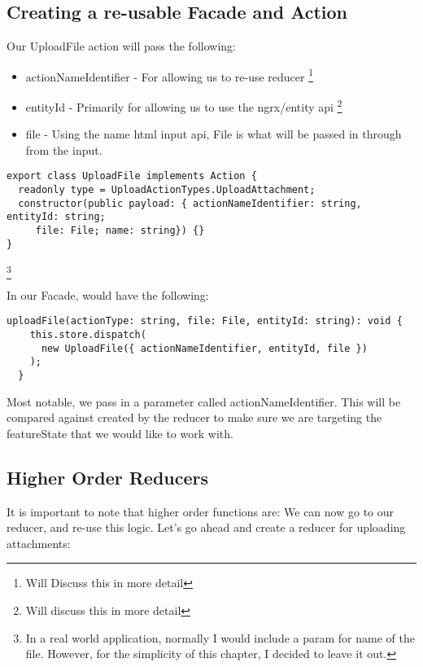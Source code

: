 \subsection{Creating a re-usable Facade and Action}
Our UploadFile action will pass the following:
\begin{itemize}
  \item actionNameIdentifier - For allowing us to re-use reducer
  \footnote{Will Discuss this in more detail}
  \item entityId - Primarily for allowing us to use the ngrx/entity api
  \footnote{Will discuss this in more detail}
  \item file - Using the name html input api, File is what will be passed in
  through from the input.
\end{itemize}
\begin{lstlisting}
export class UploadFile implements Action {
  readonly type = UploadActionTypes.UploadAttachment;
  constructor(public payload: { actionNameIdentifier: string, entityId: string;
     file: File; name: string}) {}
}
\end{lstlisting}
\footnote{In a real world application, normally I would include a param for name
of the file. However, for the simplicity of this chapter, I decided to leave
it out.}

In our Facade, would have the following:

\begin{lstlisting}
uploadFile(actionType: string, file: File, entityId: string): void {
    this.store.dispatch(
      new UploadFile({ actionNameIdentifier, entityId, file })
    );
  }
\end{lstlisting}

Most notable, we pass in a parameter called actionNameIdentifier. This will be
compared against created by the reducer to make sure we are targeting the
featureState that we would like to work with.

\subsection{Higher Order Reducers}

It is important to note that higher order functions are:
We can now go to our reducer, and re-use this logic. Let's
go ahead and create a reducer for uploading attachments:

